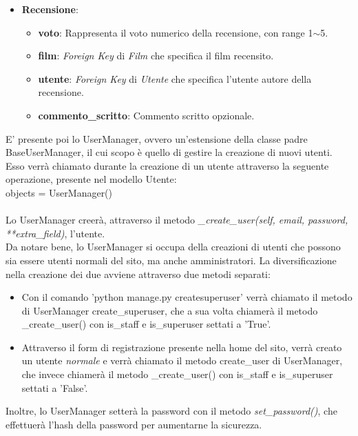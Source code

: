 \documentclass[12pt]{article}
\begin{document}
\begin{itemize}
		
		
		\item \textbf{Recensione}:
		\begin{itemize}
			\item \textbf{voto}: Rappresenta il voto numerico della recensione, con range 1$\sim$5.
			\item \textbf{film}: \textit{Foreign Key} di \textit{Film} che specifica il film recensito.
			\item \textbf{utente}: \textit{Foreign Key} di \textit{Utente} che specifica l'utente autore della recensione.
			\item \textbf{commento\_scritto}: Commento scritto opzionale.
		\end{itemize}
	\end{itemize}

	\noindent E' presente poi lo UserManager, ovvero un'estensione della classe padre BaseUserManager, il cui scopo è quello di gestire la creazione di nuovi utenti. Esso verrà chiamato durante la creazione di un utente attraverso la seguente operazione, presente nel modello Utente:\\ \noindent objects = UserManager() \\ \\
	Lo UserManager creerà, attraverso il metodo \textit{\_create\_user(self, email, password, **extra\_field)}, l'utente. \\
	Da notare bene, lo UserManager si occupa della creazioni di utenti che possono sia essere utenti normali del sito, ma anche amministratori. La diversificazione nella creazione dei due avviene attraverso due metodi separati:
		\begin{itemize}
			\item Con il comando 'python manage.py createsuperuser' verrà chiamato il metodo di UserManager create\_superuser, che a sua volta chiamerà il metodo \_create\_user() con is\_staff e is\_superuser settati a 'True'.
			\item Attraverso il form di registrazione presente nella home del sito, verrà creato un utente \textit{normale} e verrà chiamato il metodo create\_user di UserManager, che invece  chiamerà il metodo \_create\_user() con is\_staff e is\_superuser settati a 'False'.
		\end{itemize}
	
	\noindent Inoltre, lo UserManager setterà la password con il metodo \textit{set\_password()}, che effettuerà l'hash della password per aumentarne la sicurezza.
\end{document}
